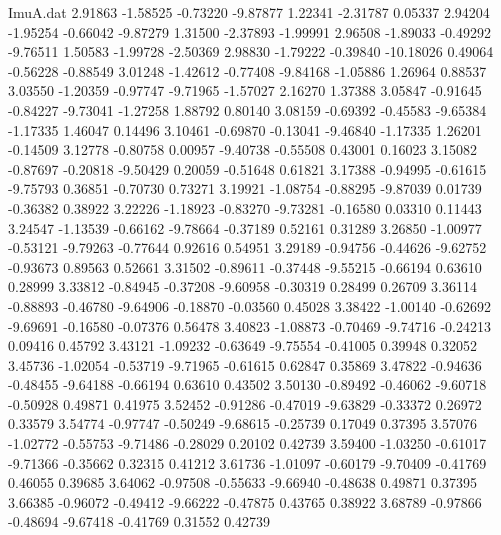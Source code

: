 \begin{filecontents}{ImuA.dat}
   2.91863   -1.58525   -0.73220   -9.87877    1.22341   -2.31787    0.05337
   2.94204   -1.95254   -0.66042   -9.87279    1.31500   -2.37893   -1.99991
   2.96508   -1.89033   -0.49292   -9.76511    1.50583   -1.99728   -2.50369
   2.98830   -1.79222   -0.39840  -10.18026    0.49064   -0.56228   -0.88549
   3.01248   -1.42612   -0.77408   -9.84168   -1.05886    1.26964    0.88537
   3.03550   -1.20359   -0.97747   -9.71965   -1.57027    2.16270    1.37388
   3.05847   -0.91645   -0.84227   -9.73041   -1.27258    1.88792    0.80140
   3.08159   -0.69392   -0.45583   -9.65384   -1.17335    1.46047    0.14496
   3.10461   -0.69870   -0.13041   -9.46840   -1.17335    1.26201   -0.14509
   3.12778   -0.80758    0.00957   -9.40738   -0.55508    0.43001    0.16023
   3.15082   -0.87697   -0.20818   -9.50429    0.20059   -0.51648    0.61821
   3.17388   -0.94995   -0.61615   -9.75793    0.36851   -0.70730    0.73271
   3.19921   -1.08754   -0.88295   -9.87039    0.01739   -0.36382    0.38922
   3.22226   -1.18923   -0.83270   -9.73281   -0.16580    0.03310    0.11443
   3.24547   -1.13539   -0.66162   -9.78664   -0.37189    0.52161    0.31289
   3.26850   -1.00977   -0.53121   -9.79263   -0.77644    0.92616    0.54951
   3.29189   -0.94756   -0.44626   -9.62752   -0.93673    0.89563    0.52661
   3.31502   -0.89611   -0.37448   -9.55215   -0.66194    0.63610    0.28999
   3.33812   -0.84945   -0.37208   -9.60958   -0.30319    0.28499    0.26709
   3.36114   -0.88893   -0.46780   -9.64906   -0.18870   -0.03560    0.45028
   3.38422   -1.00140   -0.62692   -9.69691   -0.16580   -0.07376    0.56478
   3.40823   -1.08873   -0.70469   -9.74716   -0.24213    0.09416    0.45792
   3.43121   -1.09232   -0.63649   -9.75554   -0.41005    0.39948    0.32052
   3.45736   -1.02054   -0.53719   -9.71965   -0.61615    0.62847    0.35869
   3.47822   -0.94636   -0.48455   -9.64188   -0.66194    0.63610    0.43502
   3.50130   -0.89492   -0.46062   -9.60718   -0.50928    0.49871    0.41975
   3.52452   -0.91286   -0.47019   -9.63829   -0.33372    0.26972    0.33579
   3.54774   -0.97747   -0.50249   -9.68615   -0.25739    0.17049    0.37395
   3.57076   -1.02772   -0.55753   -9.71486   -0.28029    0.20102    0.42739
   3.59400   -1.03250   -0.61017   -9.71366   -0.35662    0.32315    0.41212
   3.61736   -1.01097   -0.60179   -9.70409   -0.41769    0.46055    0.39685
   3.64062   -0.97508   -0.55633   -9.66940   -0.48638    0.49871    0.37395
   3.66385   -0.96072   -0.49412   -9.66222   -0.47875    0.43765    0.38922
   3.68789   -0.97866   -0.48694   -9.67418   -0.41769    0.31552    0.42739

\end{filecontents}
